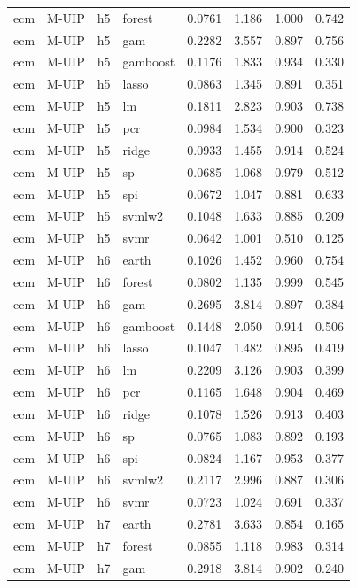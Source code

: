 \begin{ThreePartTable}
\begin{longtable}[t]{llclcccc}
ecm & M-UIP & h5 & forest & 0.0761 & 1.186 & 1.000 & 0.742\\
ecm & M-UIP & h5 & gam & 0.2282 & 3.557 & 0.897 & 0.756\\
ecm & M-UIP & h5 & gamboost & 0.1176 & 1.833 & 0.934 & 0.330\\
ecm & M-UIP & h5 & lasso & 0.0863 & 1.345 & 0.891 & 0.351\\
ecm & M-UIP & h5 & lm & 0.1811 & 2.823 & 0.903 & 0.738\\
ecm & M-UIP & h5 & pcr & 0.0984 & 1.534 & 0.900 & 0.323\\
ecm & M-UIP & h5 & ridge & 0.0933 & 1.455 & 0.914 & 0.524\\
ecm & M-UIP & h5 & sp & 0.0685 & 1.068 & 0.979 & 0.512\\
ecm & M-UIP & h5 & spi & 0.0672 & 1.047 & 0.881 & 0.633\\
ecm & M-UIP & h5 & svmlw2 & 0.1048 & 1.633 & 0.885 & 0.209\\
ecm & M-UIP & h5 & svmr & 0.0642 & 1.001 & 0.510 & 0.125\\
\addlinespace
ecm & M-UIP & h6 & earth & 0.1026 & 1.452 & 0.960 & 0.754\\
ecm & M-UIP & h6 & forest & 0.0802 & 1.135 & 0.999 & 0.545\\
ecm & M-UIP & h6 & gam & 0.2695 & 3.814 & 0.897 & 0.384\\
ecm & M-UIP & h6 & gamboost & 0.1448 & 2.050 & 0.914 & 0.506\\
ecm & M-UIP & h6 & lasso & 0.1047 & 1.482 & 0.895 & 0.419\\
ecm & M-UIP & h6 & lm & 0.2209 & 3.126 & 0.903 & 0.399\\
ecm & M-UIP & h6 & pcr & 0.1165 & 1.648 & 0.904 & 0.469\\
ecm & M-UIP & h6 & ridge & 0.1078 & 1.526 & 0.913 & 0.403\\
ecm & M-UIP & h6 & sp & 0.0765 & 1.083 & 0.892 & 0.193\\
ecm & M-UIP & h6 & spi & 0.0824 & 1.167 & 0.953 & 0.377\\
ecm & M-UIP & h6 & svmlw2 & 0.2117 & 2.996 & 0.887 & 0.306\\
ecm & M-UIP & h6 & svmr & 0.0723 & 1.024 & 0.691 & 0.337\\
\addlinespace
ecm & M-UIP & h7 & earth & 0.2781 & 3.633 & 0.854 & 0.165\\
ecm & M-UIP & h7 & forest & 0.0855 & 1.118 & 0.983 & 0.314\\
ecm & M-UIP & h7 & gam & 0.2918 & 3.814 & 0.902 & 0.240\\

\end{longtable}
\end{ThreePartTable}
